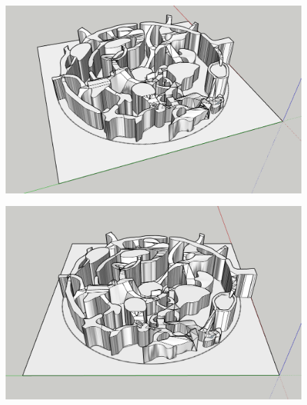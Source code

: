 \begin{figure}[H]
	\centering
	\includegraphics[width=14cm]{images/map/3D_map_009.png}
\end{figure}
\vspace*{3cm}
\begin{figure}[H]
	\centering
	\includegraphics[width=14cm]{images/map/3D_map_010.png}
\end{figure}

